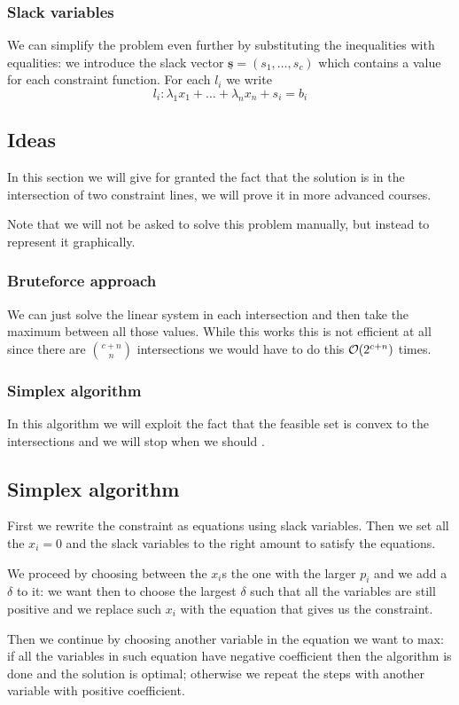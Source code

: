 \documentclass[12pt]{extarticle}
\renewcommand{\vec}[1]{\underline{\mathbf{#1}}}
\begin{document}
\subsubsection{Slack variables}

We can simplify the problem even further by substituting the inequalities with equalities:
we introduce the slack vector $\vec s = (s_1, \ldots, s_c)$ which contains a value for each constraint function.
For each $l_i$ we write
\begin{equation}
    l_i: \lambda_1 x_1 + \dots + \lambda_n x_n + s_i = b_i
\end{equation}

\subsection{Ideas}

In this section we will give for granted the fact that the solution is in the intersection of two constraint lines, we will prove it in more advanced courses.

Note that we will not be asked to solve this problem manually, but instead to represent it graphically.

\subsubsection{Bruteforce approach}

We can just solve the linear system in each intersection and then take the maximum between all those values.
While this works this is not efficient at all since there are $\binom{c+n}{n}$ intersections we would have to do this $\mathcal{O}(2^{c+n})$ times.

\subsubsection{Simplex algorithm}

In this algorithm we will exploit the fact that the feasible set is convex to  the intersections and we will stop when we should .

\subsection{Simplex algorithm}

First we rewrite the constraint as equations using slack variables.
Then we set all the $x_i = 0$ and the slack variables to the right amount to satisfy the equations.

We proceed by choosing between the $x_i$s the one with the larger $p_i$ and we add a $\delta$ to it: we want then to choose the largest $\delta$ such that all the variables are still positive and we replace such $x_i$ with the equation that gives us the constraint.

Then we continue by choosing another variable in the equation we want to max:
if all the variables in such equation have negative coefficient then the algorithm is done and the solution is optimal;
otherwise we repeat the steps with another variable with positive coefficient.
\end{document}
